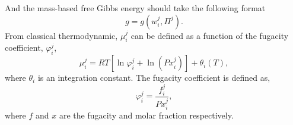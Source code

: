 \documentclass[12pts,a4paper,amsmath,amssymb,floatfix]{article}%
\newcommand{\frc}{\displaystyle\frac}
\begin{document}
And the mass-based free Gibbs energy should take the following format
\begin{displaymath}
g = g\left(w_{i}^{j},\Pi^{j}\right).
\end{displaymath}
From classical thermodynamic, $\mu_{i}^{j}$ can be defined as a function of the fugacity coefficient, $\varphi_{i}^{j}$,
\begin{equation}
\mu_{i}^{j}= R T\left[\ln\varphi_{i}^{j} + \ln\left(P x_{i}^{j}\right)\right] + \theta_{i}\left(T\right),
\end{equation}
where $\theta_{i}$ is an integration constant. The fugacity coefficient is defined as,
\begin{equation}
\varphi_{i}^{j} = \frc{f_{i}^{j}}{P x_{i}^{j}},
\end{equation}
where $f$ and $x$ are the fugacity and molar fraction respectively.

%
%

\end{document}
